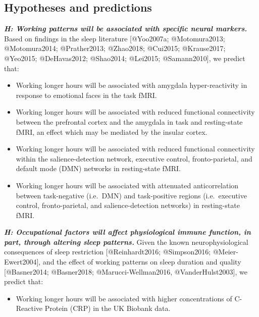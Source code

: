 \documentclass[
]{article}
\providecommand{\tightlist}{%
  \setlength{\itemsep}{0pt}\setlength{\parskip}{0pt}}
\begin{document}
\newpage

\hypertarget{hypotheses-and-predictions}{%
\subsection{Hypotheses and
predictions}\label{hypotheses-and-predictions}}

\textbf{\emph{H: Working patterns will be associated with specific
neural markers.}} Based on findings in the sleep literature
{[}@Yoo2007a; @Motomura2013; @Motomura2014; @Prather2013; @Zhao2018;
@Cui2015; @Krause2017; @Yeo2015; @DeHavas2012; @Shao2014; @Lei2015;
@Samann2010{]}, we predict that:

\begin{itemize}
\item
  Working longer hours will be associated with amygdala hyper-reactivity
  in response to emotional faces in the task fMRI.
\item
  Working longer hours will be associated with reduced functional
  connectivity between the prefrontal cortex and the amygdala in task
  and resting-state fMRI, an effect which may be mediated by the insular
  cortex.
\item
  Working longer hours will be associated with reduced functional
  connectivity within the salience-detection network, executive control,
  fronto-parietal, and default mode (DMN) networks in resting-state
  fMRI.
\item
  Working longer hours will be associated with attenuated
  anticorrelation between task-negative (i.e.~DMN) and task-positive
  regions (i.e.~executive control, fronto-parietal, and
  salience-detection networks) in resting-state fMRI.
\end{itemize}

\hspace{1cm}

\textbf{\emph{H: Occupational factors will affect physiological immune
function, in part, through altering sleep patterns.}} Given the known
neurophysiological consequences of sleep restriction {[}@Reinhardt2016;
@Simpson2016; @Meier-Ewert2004{]}, and the effect of working patterns on
sleep duration and quality {[}@Basner2014; @Basner2018;
@Marucci-Wellman2016, @VanderHulst2003{]}, we predict that:

\begin{itemize}
\tightlist
\item
  Working longer hours will be associated with higher concentrations of
  C-Reactive Protein (CRP) in the UK Biobank data.
\end{itemize}
\end{document}
